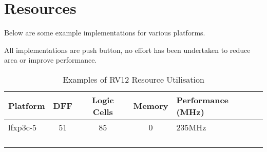 \section{Resources}\label{resources}

Below are some example implementations for various platforms.

All implementations are push button, no effort has been undertaken to
reduce area or improve performance.

\begin{longtable}[]{@{}lcccl@{}}
\toprule
Platform & DFF & Logic Cells & Memory & Performance (MHz)\tabularnewline
\midrule
\endhead
lfxp3c-5 & 51 & 85 & 0 & 235MHz\tabularnewline
& & & &\tabularnewline
& & & &\tabularnewline
& & & &\tabularnewline
\bottomrule
\caption{Examples of RV12 Resource Utilisation}
\label{tab:resource-utilistion}
\end{longtable}
